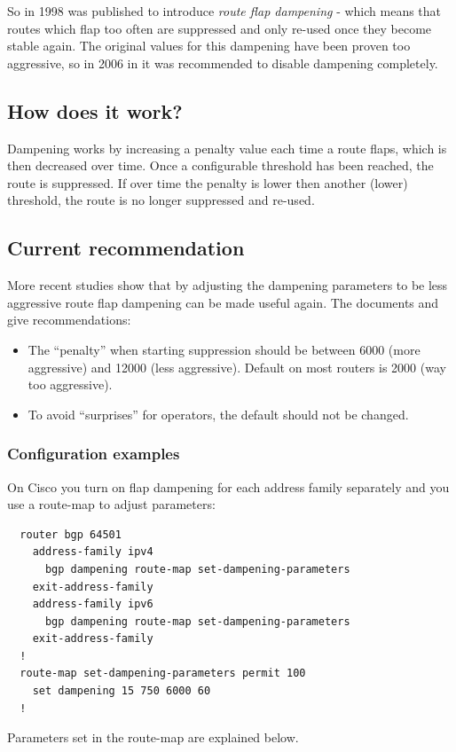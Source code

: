 So in 1998  was published to introduce \emph{route flap dampening} - which means that routes which flap too often are suppressed and only re-used once they become stable again. The original values for this dampening have been proven too aggressive, so in 2006 in \cite{ripe378} it was recommended to disable dampening completely.

\subsection{How does it work?}
Dampening works by increasing a penalty value each time a route flaps, which is then decreased over time. Once a configurable threshold has been reached, the route is suppressed. If over time the penalty is lower then another (lower) threshold, the route is no longer suppressed and re-used.


\subsection{Current recommendation}
More recent studies show that by adjusting the dampening parameters to be less aggressive route flap dampening can be made useful again. The documents  and \cite{ripe580} give recommendations:
\begin{itemize}
  \item The ``penalty'' when starting suppression should be between 6000 (more aggressive) and 12000 (less aggressive). Default on most routers is 2000 (way too aggressive).
  \item To avoid ``surprises'' for operators, the default should not be changed.
\end{itemize}

\subsubsection{Configuration examples}
On Cisco you turn on flap dampening for each address family separately and you use a route-map to adjust parameters:
\begin{verbatim}
  router bgp 64501
    address-family ipv4
      bgp dampening route-map set-dampening-parameters
    exit-address-family
    address-family ipv6
      bgp dampening route-map set-dampening-parameters
    exit-address-family
  !
  route-map set-dampening-parameters permit 100
    set dampening 15 750 6000 60
  !
\end{verbatim}
Parameters set in the route-map are explained below.

